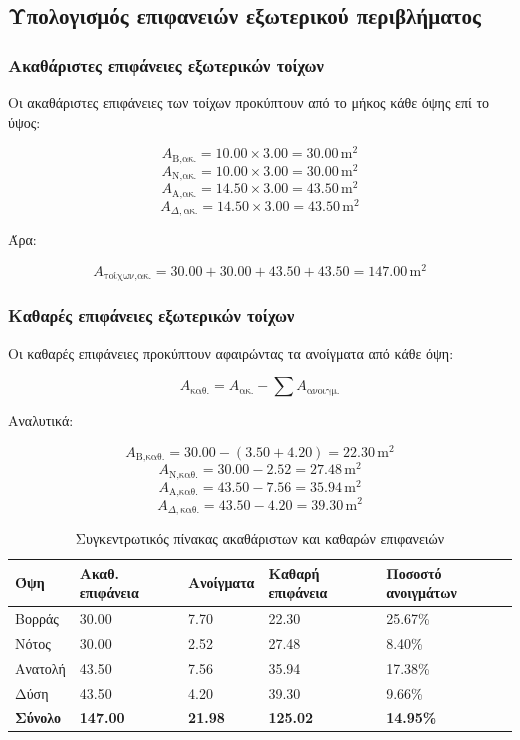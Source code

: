 \documentclass[12pt,a4paper]{article}
\begin{document}
\subsection{Υπολογισμός επιφανειών εξωτερικού περιβλήματος}

\subsubsection{Ακαθάριστες επιφάνειες εξωτερικών τοίχων}

Οι ακαθάριστες επιφάνειες των τοίχων προκύπτουν από το μήκος κάθε όψης επί το ύψος:

\[
A_{\text{Β,ακ.}} = 10.00 \times 3.00 = 30.00\,\mathrm{m^2}
\]
\[
A_{\text{Ν,ακ.}} = 10.00 \times 3.00 = 30.00\,\mathrm{m^2}
\]
\[
A_{\text{Α,ακ.}} = 14.50 \times 3.00 = 43.50\,\mathrm{m^2}
\]
\[
A_{\Delta,\text{ακ.}} = 14.50 \times 3.00 = 43.50\,\mathrm{m^2}
\]

Άρα:

\[
A_{\text{τοίχων,ακ.}} = 30.00 + 30.00 + 43.50 + 43.50 = 147.00\,\mathrm{m^2}
\]

\subsubsection{Καθαρές επιφάνειες εξωτερικών τοίχων}

Οι καθαρές επιφάνειες προκύπτουν αφαιρώντας τα ανοίγματα από κάθε όψη:

\[
A_{\text{καθ.}} = A_{\text{ακ.}} - \sum A_{\text{ανοιγμ.}}
\]

Αναλυτικά:

\[
A_{\text{Β,καθ.}} = 30.00 - (3.50 + 4.20) = 22.30\,\mathrm{m^2}
\]
\[
A_{\text{Ν,καθ.}} = 30.00 - 2.52 = 27.48\,\mathrm{m^2}
\]
\[
A_{\text{Α,καθ.}} = 43.50 - 7.56 = 35.94\,\mathrm{m^2}
\]
\[
A_{\Delta,\text{καθ.}} = 43.50 - 4.20 = 39.30\,\mathrm{m^2}
\]

\begin{table}[H]
\centering
\small
\caption{Συγκεντρωτικός πίνακας ακαθάριστων και καθαρών επιφανειών}
\begin{tabularx}{\textwidth}{L C{2.4cm} C{2.4cm} C{2.4cm} C{2.4cm}}
\toprule
\textbf{Όψη} & \textbf{Ακαθ. επιφάνεια} & \textbf{Ανοίγματα} & \textbf{Καθαρή επιφάνεια} & \textbf{Ποσοστό ανοιγμάτων} \\
\midrule
Βορράς & 30.00 & 7.70 & 22.30 & 25.67\% \\
Νότος & 30.00 & 2.52 & 27.48 & 8.40\% \\
Ανατολή & 43.50 & 7.56 & 35.94 & 17.38\% \\
Δύση & 43.50 & 4.20 & 39.30 & 9.66\% \\
\midrule
\textbf{Σύνολο} & \textbf{147.00} & \textbf{21.98} & \textbf{125.02} & \textbf{14.95\%} \\
\bottomrule
\end{tabularx}
\end{table}
\end{document}
